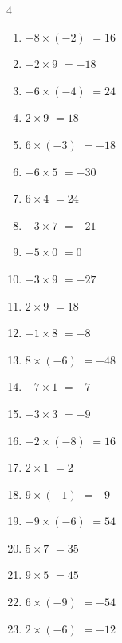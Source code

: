\begin{multicols}{4}
\begin{enumerate}
  \item $-8\times (-2)$
        $=16$

  \item $-2\times 9$
        $=-18$

  \item $-6\times (-4)$
        $=24$

  \item $2\times 9$
        $=18$

  \item $6\times (-3)$
        $=-18$

  \item $-6\times 5$
        $=-30$

  \item $6\times 4$
        $=24$

  \item $-3\times 7$
        $=-21$

  \item $-5\times 0$
        $=0$

  \item $-3\times 9$
        $=-27$

  \item $2\times 9$
        $=18$

  \item $-1\times 8$
        $=-8$

  \item $8\times (-6)$
        $=-48$

  \item $-7\times 1$
        $=-7$

  \item $-3\times 3$
        $=-9$

  \item $-2\times (-8)$
        $=16$

  \item $2\times 1$
        $=2$

  \item $9\times (-1)$
        $=-9$

  \item $-9\times (-6)$
        $=54$

  \item $5\times 7$
        $=35$

  \item $9\times 5$
        $=45$

  \item $6\times (-9)$
        $=-54$

  \item $2\times (-6)$
        $=-12$


\end{enumerate}
\end{multicols}
